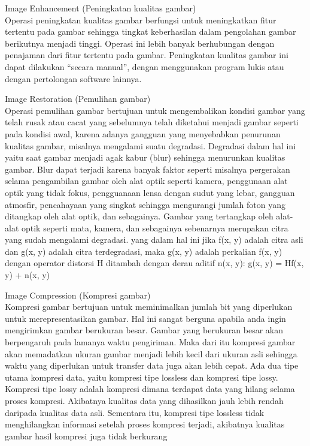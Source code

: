 \begin{packed_enum}
	\item Image Enhancement (Peningkatan kualitas gambar)
	\\	Operasi peningkatan kualitas gambar berfungsi untuk meningkatkan fitur tertentu pada gambar sehingga tingkat keberhasilan dalam pengolahan gambar berikutnya menjadi tinggi. Operasi ini lebih banyak berhubungan dengan penajaman dari fitur tertentu pada gambar. Peningkatan kualitas gambar ini dapat dilakukan “secara manual”, dengan menggunakan program lukis atau dengan pertolongan software lainnya.
	\item Image Restoration (Pemulihan gambar)
	\\	Operasi pemulihan gambar bertujuan untuk mengembalikan kondisi gambar yang telah rusak atau cacat yang sebelumnya telah diketahui menjadi gambar seperti pada kondisi awal, karena adanya gangguan yang menyebabkan penurunan kualitas gambar, misalnya mengalami suatu degradasi. Degradasi dalam hal ini yaitu saat gambar menjadi agak kabur (blur) sehingga menurunkan kualitas gambar. Blur dapat terjadi karena banyak faktor seperti  misalnya pergerakan selama pengambilan gambar oleh alat optik seperti kamera, penggunaan alat optik yang tidak fokus, pengguanaan lensa dengan sudut yang lebar, gangguan atmosfir, pencahayaan yang singkat sehingga mengurangi jumlah foton yang ditangkap oleh alat optik, dan sebagainya. Gambar yang tertangkap oleh alat-alat optik seperti mata, kamera, dan sebagainya sebenarnya merupakan citra yang sudah mengalami degradasi. yang dalam hal ini jika f(x, y) adalah citra asli dan g(x, y) adalah citra terdegradasi, maka g(x, y) adalah perkalian f(x, y) dengan operator distorsi H ditambah dengan derau aditif n(x, y): g(x, y) = Hf(x, y) + n(x, y)
	\item Image Compression (Kompresi gambar)
	\\	Kompresi gambar bertujuan untuk meminimalkan jumlah bit yang diperlukan untuk merepresentasikan gambar. Hal ini sangat berguna apabila anda ingin mengirimkan gambar berukuran besar. Gambar yang berukuran besar akan berpengaruh pada lamanya waktu pengiriman. Maka dari itu kompresi gambar akan memadatkan ukuran gambar menjadi lebih kecil dari ukuran asli sehingga waktu yang diperlukan untuk transfer data juga akan lebih cepat.	
	Ada dua tipe utama kompresi data, yaitu kompresi tipe lossless dan kompresi tipe lossy. Kompresi tipe lossy adalah kompresi dimana terdapat data yang hilang selama proses kompresi. Akibatnya kualitas data yang dihasilkan jauh lebih rendah daripada kualitas data asli. Sementara itu, kompresi tipe lossless tidak menghilangkan informasi setelah proses kompresi terjadi, akibatnya kualitas gambar hasil kompresi juga tidak berkurang

\end{packed_enum}
